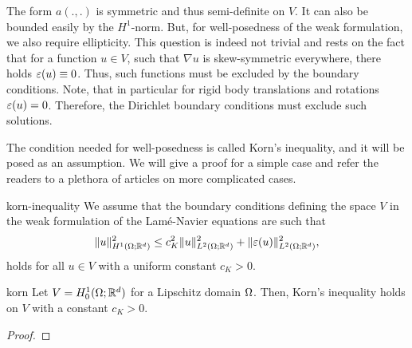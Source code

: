 \begin{intro}
  The form $a(.,.)$ is symmetric and thus semi-definite on $V$. It can
  also be bounded easily by the $H^1$-norm. But, for well-posedness of
  the weak formulation, we also require ellipticity. This question is
  indeed not trivial and rests on the fact that for a function
  $u\in V$, such that $\nabla u$ is skew-symmetric everywhere, there
  holds $\varepsilon(u)\equiv 0$. Thus, such functions must be excluded by
  the boundary conditions. Note, that in particular for rigid body
  translations and rotations $\varepsilon(u) = 0$. Therefore, the Dirichlet
  boundary conditions must exclude such solutions.
  
  The condition needed for well-posedness is called Korn's inequality,
  and it will be posed as an assumption. We will give a proof for a
  simple case and refer the readers to a plethora of articles on more
  complicated cases.
\end{intro}

\begin{Assumption}{korn-inequality}
  We assume that the boundary conditions defining the space $V$ in the
  weak formulation of the Lam\'e-Navier equations are such that
  \begin{gather}
    \label{eq:mixedintro:korn}
    \lVert u\rVert_{H^1(\Omega;\mathbb R^d)}^2
    \le c_K^2 \lVert u\rVert_{L^2(\Omega;\mathbb R^d)}^2
    + \lVert\varepsilon(u)\rVert_{L^2(\Omega;\mathbb R^d)}^2,
  \end{gather}
  holds for all $u\in V$ with a uniform constant $c_K>0$.
\end{Assumption}

\begin{Lemma}{korn}
  Let $V = H^1_0(\Omega;\mathbb R^d)$ for a Lipschitz domain
  $\Omega$. Then, Korn's inequality holds on $V$ with a constant
  $c_K>0$.
\end{Lemma}

\begin{proof}
  
\end{proof}

